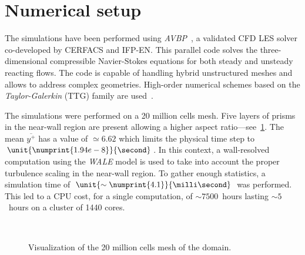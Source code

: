 \section{Numerical setup}\label{sec:ls89_num}

The simulations have been performed using \textit{AVBP}~\cite{Gicquel2011}, a validated CFD LES solver co-developed by CERFACS and IFP-EN. This parallel code solves the three-dimensional compressible Navier-Stokes equations for both steady and unsteady reacting flows. The code is capable of handling hybrid unstructured meshes and allows to address complex geometries. High-order numerical schemes based on the \textit{Taylor-Galerkin} (TTG) family are used~\cite{Quartapelle1993}. 

The simulations were performed on a 20 million cells mesh. Five layers of prisms in the near-wall region are present allowing a higher aspect ratio---see~\cref{fig:ls89_mesh}. The mean $\overline{y^+}$ has a value of $\simeq 6.62$ which limits the physical time step to $\unit{\numprint{1.94e-8}}{\second}$. In this context, a wall-resolved computation using the \textit{WALE} \cite{Nicoud1999} model is used to take into account the proper turbulence scaling in the near-wall region. To gather enough statistics, a simulation time of $\unit{\sim\numprint{4.1}}{\milli\second}$ was performed. This led to a CPU cost, for a single computation, of $\sim7500$~hours lasting $\sim5$~hours on a cluster of 1440 cores.

\begin{figure}[!h]               
\centering
{}
 ~       
\caption{Visualization of the 20 million cells mesh of the domain.}
\label{fig:ls89_mesh}
\end{figure}

